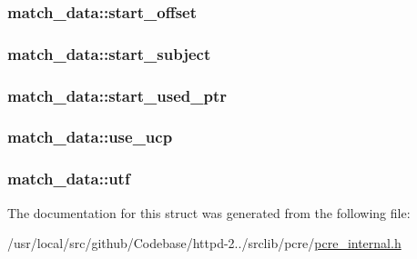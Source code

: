 \subsubsection[{\texorpdfstring{start\+\_\+offset}{start_offset}}]{ match\+\_\+data\+::start\+\_\+offset}\hypertarget{structmatch__data_a1681986b1f484369bc61fa8910fd65a3}{}\label{structmatch__data_a1681986b1f484369bc61fa8910fd65a3}
\subsubsection[{\texorpdfstring{start\+\_\+subject}{start_subject}}]{ match\+\_\+data\+::start\+\_\+subject}\hypertarget{structmatch__data_a463372ba613f0f74066c89590b55f35e}{}\label{structmatch__data_a463372ba613f0f74066c89590b55f35e}
\subsubsection[{\texorpdfstring{start\+\_\+used\+\_\+ptr}{start_used_ptr}}]{ match\+\_\+data\+::start\+\_\+used\+\_\+ptr}\hypertarget{structmatch__data_a40b57f042d200e27b92051307f6d3b64}{}\label{structmatch__data_a40b57f042d200e27b92051307f6d3b64}
\subsubsection[{\texorpdfstring{use\+\_\+ucp}{use_ucp}}]{ match\+\_\+data\+::use\+\_\+ucp}\hypertarget{structmatch__data_acfc9557530ba73b322419c53668465fd}{}\label{structmatch__data_acfc9557530ba73b322419c53668465fd}
\subsubsection[{\texorpdfstring{utf}{utf}}]{ match\+\_\+data\+::utf}\hypertarget{structmatch__data_ae0a8f1d33baf45dbdbff0ef7d2d22be9}{}\label{structmatch__data_ae0a8f1d33baf45dbdbff0ef7d2d22be9}


The documentation for this struct was generated from the following file\+:\begin{DoxyCompactItemize}
\item 
/usr/local/src/github/\+Codebase/httpd-\/2../srclib/pcre/\hyperlink{pcre__internal_8h}{pcre\+\_\+internal.\+h}\end{DoxyCompactItemize}
